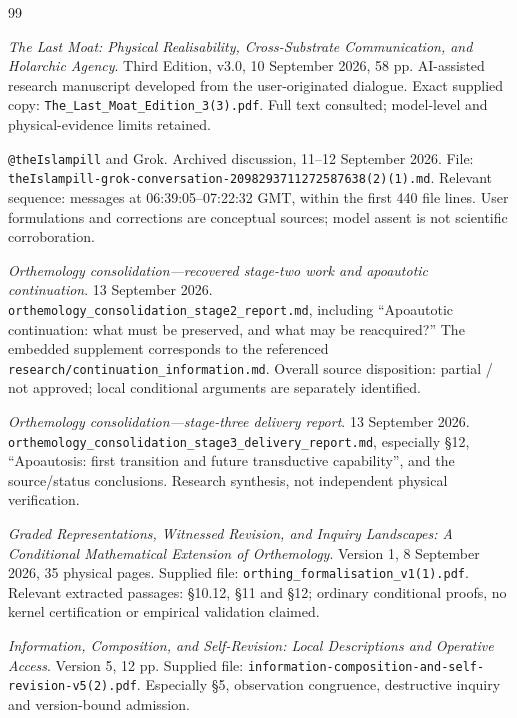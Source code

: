 \clearpage
\begin{thebibliography}{99}
 \textit{The Last Moat: Physical Realisability, Cross-Substrate Communication, and Holarchic Agency}. Third Edition, v3.0, 10 September 2026, 58 pp. AI-assisted research manuscript developed from the user-originated dialogue. Exact supplied copy: \texttt{The\_Last\_Moat\_Edition\_3(3).pdf}. Full text consulted; model-level and physical-evidence limits retained.

 \texttt{@theIslampill} and Grok. Archived discussion, 11--12 September 2026. File: \texttt{theIslampill-grok-conversation-2098293711272587638(2)(1).md}. Relevant sequence: messages at 06:39:05--07:22:32 GMT, within the first 440 file lines. User formulations and corrections are conceptual sources; model assent is not scientific corroboration.

 \textit{Orthemology consolidation---recovered stage-two work and apoautotic continuation}. 13 September 2026. \texttt{orthemology\_consolidation\_stage2\_report.md}, including ``Apoautotic continuation: what must be preserved, and what may be reacquired?'' The embedded supplement corresponds to the referenced \texttt{research/continuation\_information.md}. Overall source disposition: partial / not approved; local conditional arguments are separately identified.

 \textit{Orthemology consolidation---stage-three delivery report}. 13 September 2026. \texttt{orthemology\_consolidation\_stage3\_delivery\_report.md}, especially \S12, ``Apoautosis: first transition and future transductive capability'', and the source/status conclusions. Research synthesis, not independent physical verification.

 \textit{Graded Representations, Witnessed Revision, and Inquiry Landscapes: A Conditional Mathematical Extension of Orthemology}. Version 1, 8 September 2026, 35 physical pages. Supplied file: \texttt{orthing\_formalisation\_v1(1).pdf}. Relevant extracted passages: \S10.12, \S11 and \S12; ordinary conditional proofs, no kernel certification or empirical validation claimed.

 \textit{Information, Composition, and Self-Revision: Local Descriptions and Operative Access}. Version 5, 12 pp. Supplied file: \texttt{information-composition-and-self-revision-v5(2).pdf}. Especially \S5, observation congruence, destructive inquiry and version-bound admission.


\end{thebibliography}

